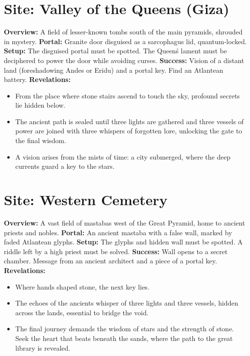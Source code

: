\documentclass[12pt]{article}
\begin{document}
\hrulefill

\section*{Site: Valley of the Queens (Giza)}
\textbf{Overview:}
A field of lesser-known tombs south of the main pyramids, shrouded in mystery.
\textbf{Portal:}
Granite door disguised as a sarcophagus lid, quantum-locked.
\textbf{Setup:}
The disguised portal must be spotted. The Queen\'s lament must be deciphered to power the door while avoiding curses.
\textbf{Success:}
Vision of a distant land (foreshadowing Andes or Eridu) and a portal key. Find an Atlantean battery.
\textbf{Revelations:}
\begin{itemize}
  \item From the place where stone stairs ascend to touch the sky, profound secrets lie hidden below.
  \item The ancient path is sealed until three lights are gathered and three vessels of power are joined with three whispers of forgotten lore, unlocking the gate to the final wisdom.
  \item A vision arises from the mists of time: a city submerged, where the deep currents guard a key to the stars.
\end{itemize}

\hrulefill

\section*{Site: Western Cemetery}
\textbf{Overview:}
A vast field of mastabas west of the Great Pyramid, home to ancient priests and nobles.
\textbf{Portal:}
An ancient mastaba with a false wall, marked by faded Atlantean glyphs.
\textbf{Setup:}
The glyphs and hidden wall must be spotted. A riddle left by a high priest must be solved.
\textbf{Success:}
Wall opens to a secret chamber. Message from an ancient architect and a piece of a portal key.
\textbf{Revelations:}
\begin{itemize}
  \item Where hands shaped stone, the next key lies.
  \item The echoes of the ancients whisper of three lights and three vessels, hidden across the lands, essential to bridge the void.
  \item The final journey demands the wisdom of stars and the strength of stone. Seek the heart that beats beneath the sands, where the path to the great library is revealed.
\end{itemize}
\end{document}
